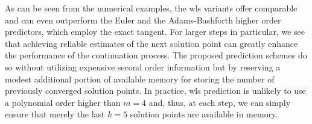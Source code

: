 As can be seen from the numerical examples, the \acrshort{wls} 
variants offer comparable and can even outperform the Euler and the 
Adams-Bashforth higher order predictors, which employ the exact tangent. For 
larger steps in 
particular, we see that achieving reliable estimates of the next solution point 
can greatly enhance the performance of the continuation process. The proposed 
prediction schemes do so without utilizing expensive second order information 
but by reserving a modest additional portion of available memory for 
storing the number of previously converged solution points. In practice, 
\acrshort{wls} prediction is unlikely to use a polynomial order higher than 
$m=4$ and, thus, at each step, we can simply ensure that merely the last $k=5$ 
solution points are available in memory. 




